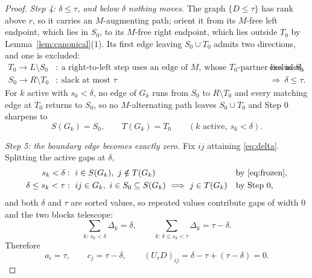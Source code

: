 \documentclass[11pt]{article}
\begin{document}
\begin{proof}
\emph{Step 4: $\delta\le\tau$, and below $\delta$ nothing moves.}  The graph
$\{D\le\tau\}$ has rank above $r$, so it carries an $M$-augmenting path; orient
it from its $M$-free left endpoint, which lies in $S_0$, to its $M$-free right
endpoint, which lies outside $T_0$ by Lemma~\ref{lem:canonical}(1).  Its first
edge leaving $S_0\cup T_0$ admits two directions, and one is excluded:
\begin{align*}
  T_0\to L\setminus S_0
    &:\ \text{a right-to-left step uses an edge of }M,
    \ \text{whose $T_0$-partner lies in $S_0$}
    &&\text{excluded},\\
  S_0\to R\setminus T_0
    &:\ \text{slack at most }\tau
    &&\Longrightarrow\ \delta\le\tau .
\end{align*}
For $k$ active with $s_k<\delta$, no edge of $G_k$ runs from $S_0$ to
$R\setminus T_0$ and every matching edge at $T_0$ returns to $S_0$, so no
$M$-alternating path leaves $S_0\cup T_0$ and Step 0 sharpens to
\begin{equation}
  S(G_k)=S_0,
  \qquad
  T(G_k)=T_0
  \qquad (k \text{ active},\ s_k<\delta).
  \label{eq:frozen}
\end{equation}

\emph{Step 5: the boundary edge becomes exactly zero.}  Fix $ij$ attaining
\eqref{eq:delta}.  Splitting the active gaps at $\delta$,
\begin{align*}
  s_k<\delta
    &:\ i\in S(G_k),\ j\notin T(G_k)
    &&\text{by \eqref{eq:frozen}},\\
  \delta\le s_k<\tau
    &:\ ij\in G_k,\ i\in S_0\subseteq S(G_k)
    \ \Longrightarrow\ j\in T(G_k)
    &&\text{by Step 0},
\end{align*}
and both $\delta$ and $\tau$ are sorted values, so repeated values contribute
gaps of width $0$ and the two blocks telescope:
\begin{equation}
  \sum_{k:\,s_k<\delta}\Delta_k=\delta,
  \qquad
  \sum_{k:\,\delta\le s_k<\tau}\Delta_k=\tau-\delta .
  \label{eq:telescope}
\end{equation}
Therefore
\begin{equation}
  a_i=\tau,
  \qquad
  c_j=\tau-\delta,
  \qquad
  (U_rD)_{ij}=\delta-\tau+(\tau-\delta)=0 .
  \label{eq:zero-edge}
\end{equation}


\end{proof}
\end{document}

